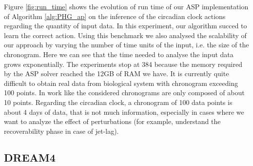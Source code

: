 Figure \ref{fig:run_time} shows the evolution of run time of our ASP implementation of Algorithm \ref{alg:PHG_ap} on the inference of the circadian clock actions regarding the quantity of input data.
In this experiment, our algorithm succed to learn the correct action.
Using this benchmark we also analysed the scalability of our approach by varying the number of time units of the input, i.e. the size of the chronogram.
Here we can see that the time needed to analyse the input data grows exponentially.
The experiments stop at 384 because the memory required by the ASP solver reached the 12GB of RAM we have.
It is currently quite difficult to obtain real data from biological system with chronogram exceeding 100 points.
In work like \cite{Fippo14} the considered chronograms are only composed of about 10 points.
Regarding the circadian clock, a chronogram of 100 data points is about 4 days of data, that is not much information, especially in cases where we want to analyze the effect of perturbations (for example, understand the recoverability phase in case of jet-lag). 


\subsection{DREAM4}
	

